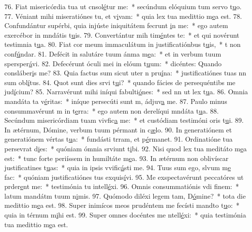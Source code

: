 76. Fiat misericórdia tua ut cnsol\uline{é}tur me:~* secúndum elóquium tum servo t\uline{u}o.
77. Véniant mihi miseratiónes tu, et v\uline{i}vam:~* quia lex tua medittio m\uline{e}a est.
78. Confundántur supérbi, quia injúste iniquitátem fecrunt \uline{i}n me:~* ego autem exercébor in mndátis t\uline{u}is.
79. Convertántur mih tim\uline{é}ntes te:~* et qui novérunt testimnia t\uline{u}a.
80. Fiat cor meum immaculátum in justificatiónbus t\uline{u}is,~* t non conf\uline{ú}ndar.
81. Defécit in salutáre tuum ánma m\uline{e}a:~* et in verbum tuum spersper\uline{á}vi.
82. Defecérunt óculi mei in elóum t\uline{u}um:~* dicéntes: Quando consláber\uline{i}s me?
83. Quia factus sum sicut uter n pru\uline{í}na:~* justificatiónes tuas nn sum obl\uline{í}tus.
84. Quot sunt dies srvi t\uline{u}i?~* quando fácies de persequéntibs me jud\uline{í}cium?
85. Narravérunt mihi iníqui fabulti\uline{ó}nes:~* sed nn ut lex t\uline{u}a.
86. Omnia mandáta ta v\uline{é}ritas:~* iníque persecúti sunt m, ádjuv\uline{a} me.
87. Paulo minus consummavérunt m in t\uline{e}rra:~* ego autem non derelíqui mndáta t\uline{u}a.
88. Secúndum misericórdiam tuam vivfic\uline{a} me:~* et custódiam testimóni oris t\uline{u}i.
89. In ætérnum, Dómine, verbum tuum pérmant in c\uline{æ}lo.
90. In generatiónem et generatiónem vértas t\uline{u}a:~* fundásti trram, et p\uline{é}rmanet.
91. Ordinatióne tua persevrat d\uline{i}es:~* quóniam ómnia srviunt t\uline{i}bi.
92. Nisi quod lex tua meditáto m\uline{e}a est:~* tunc forte periíssem in humiltáte m\uline{e}a.
93. In ætérnum non oblivíscar justificatines t\uline{u}as:~* quia in ipsis vvific\uline{á}sti me.
94. Tuus sum ego, slvum m\uline{e} fac:~* quóniam justificatiónes tus exquis\uline{í}vi.
95. Me exspectavérunt peccatóres ut prder\uline{e}nt me:~* testimónia tu intell\uline{é}xi.
96. Omnis consummatiónis vdi f\uline{i}nem:~* latum mandátm tuum n\uline{i}mis.
97. Quómodo diléxi legem tam, D\uline{ó}mine?~* tota die medittio m\uline{e}a est.
98. Super inimícos meos prudéntem me fecísti mandto t\uline{u}o:~* quia in térnum m\uline{i}hi est.
99. Super omnes docéntes me ntell\uline{é}xi:~* quia testimónia tua medittio m\uline{e}a est.
